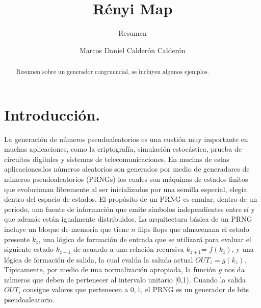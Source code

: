 \documentclass{llncs}
\begin{document}
\title{Rényi Map}

\subtitle{Resumen}




\author{Marcos Daniel Calderón Calderón}




\maketitle

\begin{abstract}
Resumen sobre un generador congruencial, se incluyen algunos ejemplos.
\end{abstract}

\section{Introducción.}

La generación de números pseudoaleatorios es una custión muy importante en muchas aplicaciones, como la criptografía, simulación estocástica, prueba de circuitos digitales y sistemas de telecomunicaciones. En muchas de estas aplicaciones,los números aleatorios son generados por medio de generadores de números pseudoaleatorios (PRNGs)  los cuales son máquinas de estados finitos que evolucionan libremente  al ser inicializados por una semilla especial, elegia dentro del espacio de estados. El propósito de un PRNG es emular, dentro de un periodo, una fuente de información que emite símbolos independientes entre sí y que además están igualmente distribuidos.
La arquitectura básica de un PRNG  incluye un bloque de memoria que tiene $n$ flips flops que almacenana el estado presente $k_{z}$, una  lógica de formación de entrada  que se utilizará para evaluar el siguiente estado $k_{z+1}$ de acuardo a una relación recursiva $k_{z+1}$= $f(k_{z})$, y una lógica de formación de salida, la cual evalúa la saluda actual $OUT_{z}= g(k_{z})$. Típicamente, por medio de una normalización apropiada, la función $g$ nos da números que deben de pertenecer al intervalo unitario [0,1). Cuando la salida $OUT_{i}$ consigue valores que pertenecen a ${0,1}$, el PRNG es un generador de bits pseudoaleatorio. 
\end{document}
